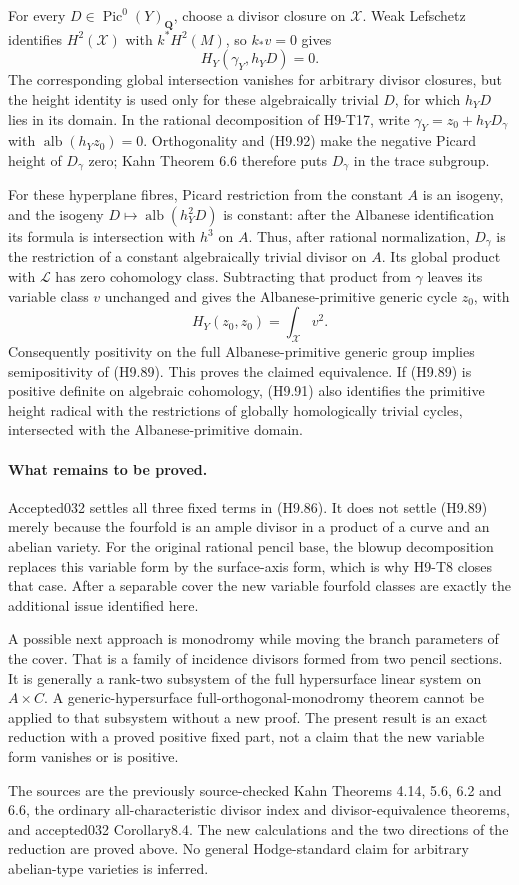 For every $D\in\operatorname{Pic}^0(Y)_{\mathbf Q}$, choose a
divisor closure on $\mathcal X$. Weak Lefschetz identifies $H^2(\mathcal X)$ with
$k^*H^2(M)$, so $k_*v=0$ gives
\[
                         H_Y(\gamma_Y,h_YD)=0.              \tag{H9.92}
\]
The corresponding global intersection vanishes for arbitrary
divisor closures, but the height identity is used only for these
algebraically trivial $D$, for which $h_YD$ lies in its domain.
In the rational decomposition of H9-T17, write
$\gamma_Y=z_0+h_YD_\gamma$ with
$\operatorname{alb}(h_Yz_0)=0$. Orthogonality and (H9.92) make
the negative Picard height of $D_\gamma$ zero; Kahn Theorem 6.6
therefore puts $D_\gamma$ in the trace subgroup.

For these hyperplane fibres, Picard restriction from the constant
$A$ is an isogeny, and the isogeny
$D\mapsto\operatorname{alb}(h_Y^2D)$ is constant: after the
Albanese identification its formula is intersection with $h^3$
on $A$. Thus, after rational normalization, $D_\gamma$ is the
restriction of a constant algebraically trivial divisor on $A$.
Its global product with $\mathcal L$ has zero cohomology class.
Subtracting that product from $\gamma$ leaves its variable class
$v$ unchanged and gives the Albanese-primitive generic cycle
$z_0$, with
\[
                          H_Y(z_0,z_0)=\int_{\mathcal X}v^2.
\]
Consequently positivity on the full Albanese-primitive generic
group implies semipositivity of (H9.89). This proves the claimed
equivalence. If (H9.89) is positive definite on algebraic
cohomology, (H9.91) also identifies the primitive height radical
with the restrictions of globally homologically trivial cycles,
intersected with the Albanese-primitive domain.

\paragraph{What remains to be proved.}
Accepted032 settles all three fixed terms in (H9.86). It does
not settle (H9.89) merely because the fourfold is an ample divisor
in a product of a curve and an abelian variety. For the original
rational pencil base, the blowup decomposition replaces this
variable form by the surface-axis form, which is why H9-T8 closes
that case. After a separable cover the new variable fourfold
classes are exactly the additional issue identified here.

A possible next approach is monodromy while moving the branch
parameters of the cover. That is a family of incidence divisors
formed from two pencil sections. It is generally a rank-two
subsystem of the full hypersurface linear system on $A\times C$.
A generic-hypersurface full-orthogonal-monodromy theorem cannot
be applied to that subsystem without a new proof. The present
result is an exact reduction with a proved positive fixed part,
not a claim that the new variable form vanishes or is positive.

The sources are the previously source-checked Kahn Theorems 4.14,
5.6, 6.2 and 6.6, the ordinary all-characteristic divisor index
and divisor-equivalence theorems, and accepted032 Corollary8.4.
The new calculations and the two directions of the reduction are
proved above. No general Hodge-standard claim for arbitrary
abelian-type varieties is inferred.
